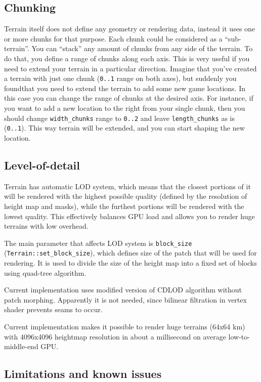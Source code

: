 \documentclass[
]{book}
\theoremstyle{definition}
\theoremstyle{definition}
\theoremstyle{definition}
\theoremstyle{definition}
\theoremstyle{remark}
\begin{document}
\subsection{Chunking}\label{chunking}

Terrain itself does not define any geometry or rendering data, instead it uses one or more chunks for that purpose. Each chunk could be considered as a ``sub-terrain''. You can ``stack'' any amount of chunks from any side of the terrain. To do that, you define a range of chunks along each axis. This is very useful if you need to extend your terrain in a particular direction. Imagine that you've created a terrain with just one chunk (\texttt{0..1} range on both axes), but suddenly you foundthat you need to extend the terrain to add some new game locations. In this case you can change the range of chunks at the desired axis. For instance, if you want to add a new location to the right from your single chunk, then you should change \texttt{width\_chunks} range to \texttt{0..2} and leave \texttt{length\_chunks} as is (\texttt{0..1}). This way terrain will be extended, and you can start shaping the new location.

\subsection{Level-of-detail}\label{level-of-detail}

Terrain has automatic LOD system, which means that the closest portions of it will be rendered with the highest possible quality (defined by the resolution of height map and masks), while the furthest portions will be rendered with the lowest quality. This effectively balances GPU load and allows you to render huge terrains with low overhead.

The main parameter that affects LOD system is \texttt{block\_size} (\texttt{Terrain::set\_block\_size}), which defines size of the patch that will be used for rendering. It is used to divide the size of the height map into a fixed set of blocks using quad-tree algorithm.

Current implementation uses modified version of CDLOD algorithm without patch morphing. Apparently it is not needed, since bilinear filtration in vertex shader prevents seams to occur.

Current implementation makes it possible to render huge terrains (64x64 km) with 4096x4096 heightmap resolution in about a millisecond on average low-to-middle-end GPU.

\subsection{Limitations and known issues}\label{limitations-and-known-issues}
\end{document}
